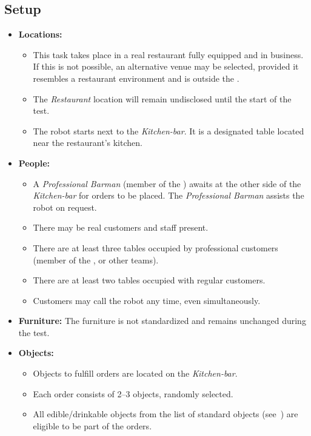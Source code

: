 \subsection*{Setup}
\begin{itemize}[nosep]	
	\item \textbf{Locations:} 
	\begin{itemize}
		\item This task takes place in a real restaurant fully equipped and in business. If this is not possible, an alternative venue may be selected, provided it resembles a restaurant environment and is outside the \Arena{}.
		\item The \emph{Restaurant} location will remain undisclosed until the start of the test.
		\item The robot starts next to the \emph{Kitchen-bar}. It is a designated table located near the restaurant's kitchen.
	\end{itemize}	 
	\item \textbf{People:} 
	\begin{itemize}
		\item  A \emph{Professional Barman} (member of the \TC{}) awaits at the other side of the \emph{Kitchen-bar} for orders to be placed. The \emph{Professional Barman} assists the robot on request.
		\item There may be real customers and staff present.
		\item There are at least three tables occupied by professional customers (member of the \OC{}, \TC{} or other teams). 
		\item There are at least two tables occupied with regular customers.
		\item Customers may call the robot any time, even simultaneously.
	\end{itemize}

	\item \textbf{Furniture:} The furniture is not standardized and remains unchanged during the test.

	\item \textbf{Objects:} 
	\begin{itemize}
	\item Objects to fulfill orders are located on the \textit{Kitchen-bar}.
	\item Each order consists of 2--3 objects, randomly selected.
	\item All edible/drinkable objects from the list of standard objects (see~) are eligible to be part of the orders.
	\end{itemize}
\end{itemize}

